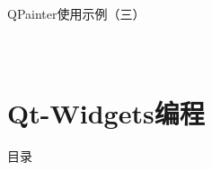 \documentclass[UTF8,aspectratio=169]{beamer}
\begin{document}
\begin{frame}[fragile]{QPainter使用示例（三）}
    \begin{columns}
        \begin{column}{0.48\textwidth}
            \inputminted[firstline=72,lastline=87]{cpp}{code/qt_painter_example.cpp}
        \end{column}
        \begin{column}{0.48\textwidth}
            \inputminted[firstline=88,lastline=96]{cpp}{code/qt_painter_example.cpp}
        \end{column}
    \end{columns}
\end{frame}

\section{Qt-Widgets编程}
\begin{frame}{目录}
    \begin{multicols}{2}
        \tableofcontents[currentsection]
    \end{multicols}
\end{frame}
\end{document}
